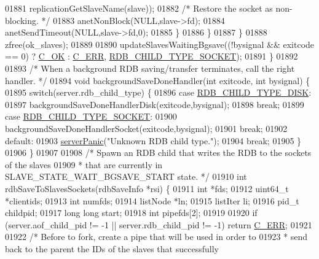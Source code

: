 \begin{DoxyCode}
{{{{{{{{{{{{{{{{{{{{{{{{{{{{{{{{{{{{{{01881                     replicationGetSlaveName(slave));
01882                 \textcolor{comment}{/* Restore the socket as non-blocking. */}
01883                 anetNonBlock(NULL,slave->fd);
01884                 anetSendTimeout(NULL,slave->fd,0);
01885             \}
01886         \}
01887     \}
01888     zfree(ok\_slaves);
01889 
01890     updateSlavesWaitingBgsave((!bysignal && exitcode == 0) ? \hyperlink{server_8h_a303769ef1065076e68731584e758d3e1}{C\_OK} : 
      \hyperlink{server_8h_af98ac28d5f4d23d7ed5985188e6fb7d1}{C\_ERR}, \hyperlink{server_8h_acdbf61346e1d2f54716e2ab6fe73e954}{RDB\_CHILD\_TYPE\_SOCKET});
01891 \}
01892 
01893 \textcolor{comment}{/* When a background RDB saving/transfer terminates, call the right handler. */}
01894 \textcolor{keywordtype}{void} backgroundSaveDoneHandler(\textcolor{keywordtype}{int} exitcode, \textcolor{keywordtype}{int} bysignal) \{
01895     \textcolor{keywordflow}{switch}(server.rdb\_child\_type) \{
01896     \textcolor{keywordflow}{case} \hyperlink{server_8h_a9d886e992717fa246dd7954244ff6bdf}{RDB\_CHILD\_TYPE\_DISK}:
01897         backgroundSaveDoneHandlerDisk(exitcode,bysignal);
01898         \textcolor{keywordflow}{break};
01899     \textcolor{keywordflow}{case} \hyperlink{server_8h_acdbf61346e1d2f54716e2ab6fe73e954}{RDB\_CHILD\_TYPE\_SOCKET}:
01900         backgroundSaveDoneHandlerSocket(exitcode,bysignal);
01901         \textcolor{keywordflow}{break};
01902     \textcolor{keywordflow}{default}:
01903         \hyperlink{server_8h_a11cc378e7778a830b41240578de3b204}{serverPanic}(\textcolor{stringliteral}{"Unknown RDB child type."});
01904         \textcolor{keywordflow}{break};
01905     \}
01906 \}
01907 
01908 \textcolor{comment}{/* Spawn an RDB child that writes the RDB to the sockets of the slaves}
01909 \textcolor{comment}{ * that are currently in SLAVE\_STATE\_WAIT\_BGSAVE\_START state. */}
01910 \textcolor{keywordtype}{int} rdbSaveToSlavesSockets(rdbSaveInfo *rsi) \{
01911     \textcolor{keywordtype}{int} *fds;
01912     uint64\_t *clientids;
01913     \textcolor{keywordtype}{int} numfds;
01914     listNode *ln;
01915     listIter li;
01916     pid\_t childpid;
01917     \textcolor{keywordtype}{long} \textcolor{keywordtype}{long} start;
01918     \textcolor{keywordtype}{int} pipefds[2];
01919 
01920     \textcolor{keywordflow}{if} (server.aof\_child\_pid != -1 || server.rdb\_child\_pid != -1) \textcolor{keywordflow}{return} 
      \hyperlink{server_8h_af98ac28d5f4d23d7ed5985188e6fb7d1}{C\_ERR};
01921 
01922     \textcolor{comment}{/* Before to fork, create a pipe that will be used in order to}
01923 \textcolor{comment}{     * send back to the parent the IDs of the slaves that successfully}
}}}}}}}}}}}}}}}}}}}}}}}}}}}}}}}}}}}}}}
\end{DoxyCode}
